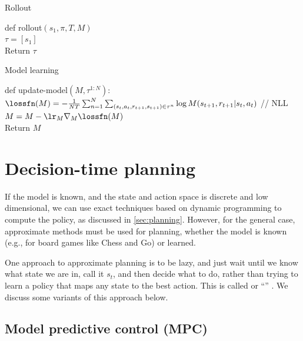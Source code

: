 \begin{algorithm}
\dontprintsemicolon
\caption{Rollout}
\label{algo:rollout}
def rollout$(s_1, \pi, T, M)$ \\
$\tau=[s_1]$ \\
Return $\tau$ 
\end{algorithm}


\begin{algorithm}
\dontprintsemicolon
\caption{Model learning}
\label{algo:update-model}
 def update-model$(M,\tau^{1:N}):$\\
 $\lossfn(M) = -\frac{1}{N T}\sum_{n=1}^N \sum_{(s_t,a_t,r_{t+1},s_{t+1}) \in \tau^n}
 \log M(s_{t+1},r_{t+1}| s_t,a_t)$ // NLL \\
    $M = M - \lr_M \nabla_M \lossfn(M)$ \\
    Return $M$\\
\end{algorithm}


\section{Decision-time planning}
\label{sec:rollout}
\label{sec:decisionTimePlanning}

If the model is known, and the state and action space is discrete
and low dimensional,
we can use exact techniques
based on dynamic programming to compute the policy,
as discussed in \cref{sec:planning}.
However, for the general case,
approximate  methods must be used for planning,
whether the model is known (e.g., for board games like Chess and Go)
or learned.

One approach to approximate planning
is to be lazy, and 
just  wait until we know what state we are in,
call it $s_t$, and then decide what to do,
rather than trying to learn a policy that maps any state to the best action.
This is called 
or  ``''
\citep{Kaelbling2011}.
We discuss some variants of this approach below.

\subsection{Model predictive control (MPC)}
\label{sec:MPC}

